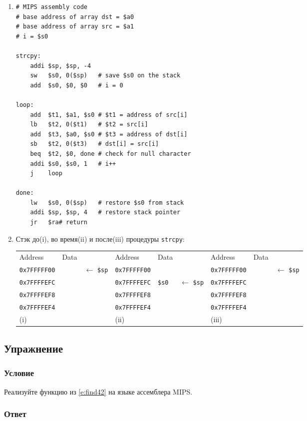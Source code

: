 \documentclass[12pt]{article}
\newenvironment{e}[1][dummy label]{
    \subsection{Упражнение}\label{#1}
    \subsubsection*{Условие}
    }{
    \subsubsection*{Ответ}
}
\newcommand{\eref}[1]{\hyperref[{e:#1}]{\nameref*{e:#1} \ref*{e:#1}}}
\begin{document}
    \begin{enumerate}
        \item
        \begin{verbatim}
# MIPS assembly code
# base address of array dst = $a0
# base address of array src = $a1
# i = $s0

strcpy:
    addi $sp, $sp, -4
    sw   $s0, 0($sp)   # save $s0 on the stack
    add  $s0, $0, $0   # i = 0

loop:
    add  $t1, $a1, $s0 # $t1 = address of src[i]
    lb   $t2, 0($t1)   # $t2 = src[i]
    add  $t3, $a0, $s0 # $t3 = address of dst[i]
    sb   $t2, 0($t3)   # dst[i] = src[i]
    beq  $t2, $0, done # check for null character
    addi $s0, $s0, 1   # i++
    j    loop

done:
    lw   $s0, 0($sp)   # restore $s0 from stack
    addi $sp, $sp, 4   # restore stack pointer
    jr   $ra# return
        \end{verbatim}

        \newpage

        \item Стэк до(i), во время(ii) и после(iii) процедуры \texttt{strcpy}:

        \begin{table}[h!]
            \small
            \setlength\tabcolsep{4pt}
            \centering
            \begin{tabular}{l|l|l|l|l|l|l|l|l}
                Address & Data & & Address & Data & & Address & Data & \\
                \texttt{0x7FFFFF00} & & $\leftarrow$ \texttt{\$sp} & \texttt{0x7FFFFF00} & & & \texttt{0x7FFFFF00} & & $\leftarrow$ \texttt{\$sp} \\
                \texttt{0x7FFFFEFC} & & & \texttt{0x7FFFFEFC} & \texttt{\$s0} & $\leftarrow$ \texttt{\$sp} & \texttt{0x7FFFFEFC} & & \\
                \texttt{0x7FFFFEF8} & & & \texttt{0x7FFFFEF8} & & & \texttt{0x7FFFFEF8} & & \\
                \texttt{0x7FFFFEF4} & & & \texttt{0x7FFFFEF4} & & & \texttt{0x7FFFFEF4} & & \\
                \multicolumn{3}{l}{(i)} & \multicolumn{3}{l}{(ii)} & \multicolumn{3}{l}{(iii)} \\
            \end{tabular}
        \end{table}
    \end{enumerate}

    \begin{e}
        Реализуйте функцию из \eref{find42} на языке ассемблера MIPS.
    \end{e}
\end{document}
